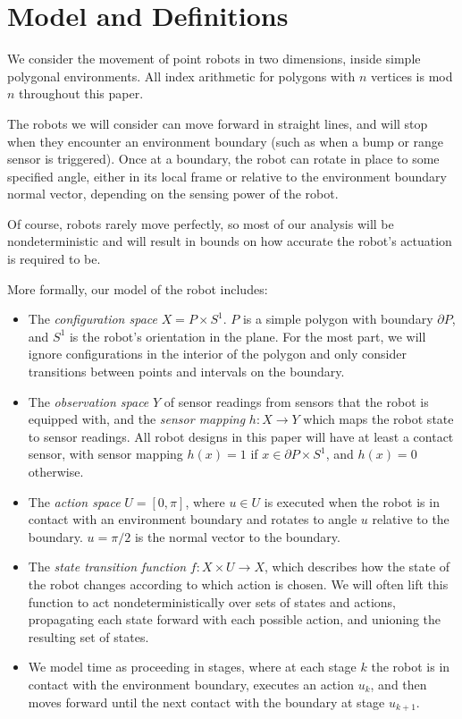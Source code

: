 \documentclass[]{article}  %
\begin{document}
\section{Model and Definitions}

We consider the movement of point robots in two dimensions, inside simple polygonal
environments. All index arithmetic for polygons with $n$ vertices is mod $n$ 
throughout this paper.

The robots we will consider can move forward in straight lines, and will stop
when they encounter an environment boundary (such as when a bump or range
sensor is triggered). Once at a boundary, the robot can rotate in place to some
specified angle, either in its local frame or relative to the environment
boundary normal vector, depending on the sensing power of the robot.

Of course, robots rarely move perfectly, so most of our analysis will be
nondeterministic and will result in bounds on how accurate the robot's actuation
is required to be.

More formally, our model of the robot includes:

\begin{itemize}
\item The \emph{configuration space} $X = P \times S^1$. $P$ is a simple polygon with 
boundary $\partial P$, and $S^1$ is the robot's orientation in the plane. For the most part, we will ignore configurations in the interior
of the polygon and only consider transitions between points and intervals on the
boundary.
\item The \emph{observation space} $Y$ of sensor readings from sensors that the
robot is equipped with, and the \emph{sensor mapping} $h: X \to Y$ which maps
the robot state to sensor readings. All robot designs in this paper will have at
least a contact sensor, with sensor mapping $h(x) = 1$ if $x \in \partial
P \times S^1$, and $h(x) = 0$ otherwise.
\item The \emph{action space} $U = [0,\pi]$, where $u \in U$ is executed when
the robot is in contact with an environment boundary and rotates to angle $u$
relative to the boundary. $u = \pi/2$ is the normal vector to the boundary.
\item The \emph{state transition function} $f: X \times U \to X$, which
describes how the state of the robot changes according to which action is
chosen. We will often lift this function to act nondeterministically over sets
of states and actions, propagating each state forward with each possible action,
and unioning the resulting set of states.
\item We model time as proceeding in stages, where at each stage $k$ the robot
is in contact with the environment boundary, executes an action $u_k$, and then
moves forward until the next contact with the boundary at stage $u_{k+1}$.
\end{itemize}
\end{document}
